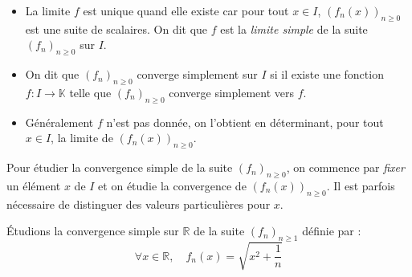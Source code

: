 \documentclass[french,11pt,twoside]{VcCours}
\begin{document}
\begin{Remarques}{}
\begin{itemize} 
\item La limite $f$ est unique quand elle existe car pour tout $x \in I$, $(f_n(x))_{n \geq 0}$ est une suite de scalaires. On dit que $f$ est la \emph{limite simple} de la suite $(f_n)_{n \geq 0}$ sur $I$.
\item On dit que $(f_n)_{n \geq 0}$ converge simplement sur $I$ si il existe une fonction $f : I \rightarrow \mathbb{K}$ telle que $(f_n)_{n \geq 0}$ converge simplement vers $f$.
\item Généralement $f$ n'est pas donnée, on l'obtient en déterminant, pour tout $x \in I$, la limite de $(f_n(x))_{n \geq 0}$.
\end{itemize}
\end{Remarques}{}

\begin{Methode}{} Pour étudier la convergence simple de la suite $(f_n)_{n \geq 0}$, on commence par \emph{fixer} un élément $x$ de $I$ et on étudie la convergence de $(f_n(x))_{n \geq 0}$. Il est parfois nécessaire de distinguer des valeurs particulières pour $x$.
\end{Methode}

\medskip

\begin{Exemple}\label{PremierEx} Étudions la convergence simple sur $\mathbb{R}$ de la suite $(f_n)_{n \geq 1}$ définie par :
$$ \forall x \in \mathbb{R}, \quad f_n(x) = \sqrt{x^2 + \frac{1}{n}}$$

\newpage

\end{Exemple}
\end{document}
